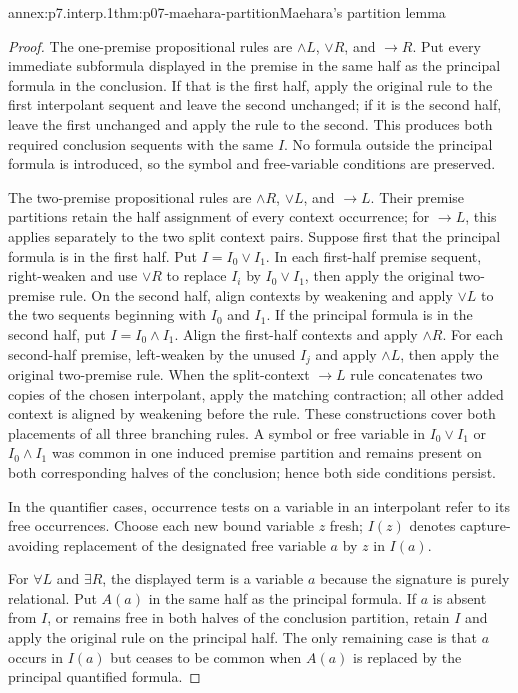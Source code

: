 \begin{annexitem}{annex:p7.interp.1}{thm:p07-maehara-partition}{Maehara's partition lemma}
\begin{proof}
The one-premise propositional rules are
\(\land L\), \(\lor R\), and \(\to R\).  Put every immediate subformula
displayed in the premise in the same half as the principal formula in the
conclusion.  If that is the first half, apply the original rule to the first
interpolant sequent and leave the second unchanged; if it is the second half,
leave the first unchanged and apply the rule to the second.  This produces
both required conclusion sequents with the same \(I\).  No formula outside the
principal formula is introduced, so the symbol and free-variable conditions
are preserved.

The two-premise propositional rules are
\(\land R\), \(\lor L\), and \(\to L\).  Their premise partitions retain the
half assignment of every context occurrence; for \(\to L\), this applies
separately to the two split context pairs.  Suppose first that the principal
formula is in the first half.  Put \(I=I_0\lor I_1\).  In each first-half
premise sequent, right-weaken and use \(\lor R\) to replace \(I_i\) by
\(I_0\lor I_1\), then apply the original two-premise rule.  On the second
half, align contexts by weakening and apply \(\lor L\) to the two sequents
beginning with \(I_0\) and \(I_1\).  If the principal formula is in the
second half, put \(I=I_0\land I_1\).  Align the first-half contexts and apply
\(\land R\).  For each second-half premise, left-weaken by the unused
\(I_j\) and apply \(\land L\), then apply the original two-premise rule.
When the split-context \(\to L\) rule concatenates two copies of the chosen
interpolant, apply the matching contraction; all other added context is aligned
by weakening before the rule.
These constructions cover both placements of all three branching rules.  A
symbol or free variable in \(I_0\lor I_1\) or \(I_0\land I_1\) was common in
one induced premise partition and remains present on both corresponding halves
of the conclusion; hence both side conditions persist.

In the quantifier cases, occurrence tests on a variable in an interpolant
refer to its free occurrences.  Choose each new bound variable \(z\)
fresh; \(I(z)\) denotes capture-avoiding replacement of the designated
free variable \(a\) by \(z\) in \(I(a)\).

For \(\forall L\) and \(\exists R\), the displayed term is a variable \(a\)
because the signature is purely relational.  Put \(A(a)\) in the same half as
the principal formula.  If \(a\) is absent from \(I\), or remains free in both
halves of the conclusion partition, retain \(I\) and apply the original rule
on the principal half.  The only remaining case is that \(a\) occurs in
\(I(a)\) but ceases to be common when \(A(a)\) is replaced by the principal
quantified formula.


\end{proof}
\end{annexitem}

